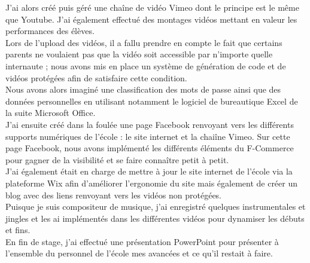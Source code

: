 \documentclass[french]{article}
\begin{document}
 J'ai alors créé puis géré une chaîne de vidéo Vimeo dont le principe est le même que Youtube. J'ai également effectué des montages vidéos mettant en valeur les performances des élèves.\\
 Lors de l'upload des vidéos, il a fallu prendre en compte le fait que certains parents ne voulaient pas que la vidéo soit accessible par n'importe quelle internaute ; nous avons mis en place un système de génération de code et de vidéos protégées afin de satisfaire cette condition.\\
 Nous avons alors imaginé une classification des mots de passe ainsi que des données personnelles en utilisant notamment le logiciel de bureautique Excel de la suite Microsoft Office. \\ 
 J'ai ensuite créé dans la foulée une page Facebook renvoyant vers les différents supports numériques de l'école : le site internet et la chaiîne Vimeo. Sur cette page Facebook, nous avons implémenté les différents éléments du F-Commerce pour gagner de la visibilité et se faire connaître petit à petit.\\
 J'ai également était en charge de mettre à jour le site internet de l'école via la plateforme Wix afin d'améliorer l'ergonomie du site mais également de créer un blog avec des liens renvoyant vers les vidéos non protégées.\\
 Puisque je suis compositeur de musique, j'ai enregistré quelques instrumentales et jingles et les ai implémentés dans les différentes vidéos pour dynamiser les débuts et fins.\\
 
\noindent En fin de stage, j'ai effectué une présentation PowerPoint pour présenter à l'ensemble du personnel de l'école mes avancées et ce qu'il restait à faire.
\end{document}
